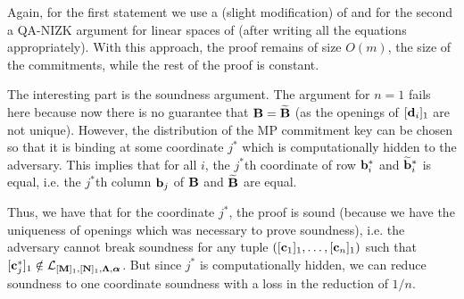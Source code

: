 Again, for the first statement we use a (slight modification) of \cite{AC:GonHevRaf15} and for the second
a QA-NIZK argument for linear spaces of \cite{C:JutRoy14,EC:KilWee15} (after writing all the equations appropriately). 
With this approach, the proof remains of size $O(m)$, the size of the commitments, while the rest of the proof is constant. 

The interesting part is the soundness argument. The argument for $n=1$ fails here because now there is no guarantee that 
 $\mathbf{{B}}=\widetilde{\mathbf{{B}}}$ (as the openings of $[\mathbf{d}_i]_1$ are not unique).  However, the distribution of the MP commitment key can be chosen so that it is binding at some coordinate $j^*$ which is computationally hidden to the adversary. This implies that for all $i$, the $j^*$th coordinate of row $\mathbf{b}_i^*$ and $\widetilde{\mathbf{b}}_i^*$ is equal, i.e. the $j^*$th column $\mathbf{b}_j$ of $\mathbf{{B}}$ and $\widetilde{\mathbf{{B}}}$ are equal.  

Thus, we have that for the coordinate $j^*$, the proof is sound (because we have the uniqueness of openings which was necessary to prove soundness), i.e. the adversary cannot break soundness for any tuple $([\mathbf{c}_1]_1,\ldots, [\mathbf{c}_n]_1)$ such that $[\mathbf{c}_j^*]_1 \notin \mathcal{L}_{[\mathbf{{M}}]_1,[\mathbf{{N}}]_1,\mathbf{{\Lambda}},{\boldsymbol \alpha}}$. 
But since $j^*$ is computationally hidden, we can reduce soundness to one coordinate soundness with a loss in the reduction of $1/n$. 





 
  
   
    
     
      
       
       









 


  






          